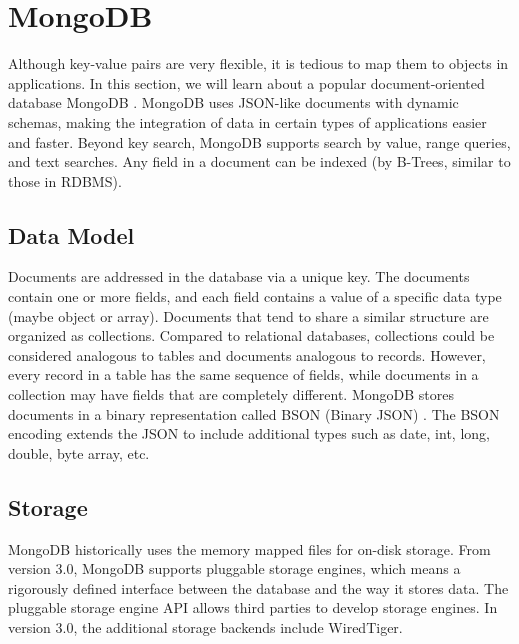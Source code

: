 \documentclass[12pt]{book}
\begin{document}
\section[MongoDB]
{MongoDB}
Although key-value pairs are very flexible, it is tedious to map them to objects in applications. In this section, we will learn about a popular document-oriented database MongoDB \cite{MongoDB}. MongoDB uses JSON-like documents with dynamic schemas, making the integration of data in certain types of applications easier and faster. Beyond key search, MongoDB supports search by value, range queries, and text searches. Any field in a document can be indexed (by B-Trees, similar to those in RDBMS).

\subsection{Data Model}

Documents are addressed in the database via a unique key. The documents contain one or more fields, and each field contains a value of a specific data type (maybe object or array). Documents that tend to share a similar structure are organized as collections. Compared to relational databases, collections could be considered analogous to tables and documents analogous to records. However, every record in a table has the same sequence of fields, while documents in a collection may have fields that are completely different. MongoDB stores documents in a binary representation called BSON (Binary JSON) \cite{BSON}. The BSON encoding extends the JSON to include additional types such as date, int, long, double, byte array, etc.

\subsection{Storage}
MongoDB historically uses the memory mapped files for on-disk storage. From version 3.0, MongoDB supports pluggable storage engines, which means a rigorously defined interface between the database and the way it stores data. The pluggable storage engine API allows third parties to develop storage engines. In version 3.0, the additional storage backends include WiredTiger.
\end{document}

